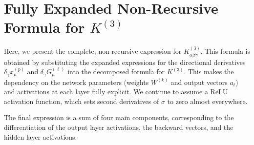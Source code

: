 \documentclass[11pt,a4paper]{article}
\theoremstyle{definition}
\begin{document}
\section{Fully Expanded Non-Recursive Formula for $K^{(3)}$}

Here, we present the complete, non-recursive expression for $K^{(3)}_{\alpha\beta\gamma}$. This formula is obtained by substituting the expanded expressions for the directional derivatives $\delta_\gamma x^{(p)}_\mu$ and $\delta_\gamma G^{(\ell)}_\mu$ into the decomposed formula for $K^{(3)}$. This makes the dependency on the network parameters (weights $W^{(k)}$ and output vectors $a_t$) and activations at each layer fully explicit. We continue to assume a ReLU activation function, which sets second derivatives of $\sigma$ to zero almost everywhere.

The final expression is a sum of four main components, corresponding to the differentiation of the output layer activations, the backward vectors, and the hidden layer activations:
\end{document}
